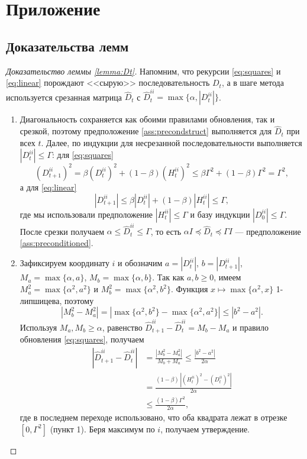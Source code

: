 \appendix
\section{Приложение}
\subsection{Доказательства лемм}
\label{appendix:lemmas}

\begin{proof}[Доказательство леммы \ref{lemma:Dt}]
Напомним, что рекурсии \eqref{eq:squares} и \eqref{eq:linear} порождают <<сырую>> последовательность $D_t$, а в шаге метода используется срезанная матрица $\hat{D}_t$ с $\hat{D}_t^{ii} = \max\{\alpha, |D_t^{ii}|\}$.
\begin{enumerate}
    \item Диагональность сохраняется как обоими правилами обновления, так и срезкой, поэтому предположение \ref{ass:precondstruct} выполняется для $\hat{D}_t$ при всех $t$. Далее, по индукции для несрезанной последовательности выполняется $|D_t^{ii}| \le \Gamma$: для \eqref{eq:squares}
    $$(D_{t+1}^{ii})^2 = \beta (D_t^{ii})^2 + (1-\beta)(H_t^{ii})^2 \le \beta \Gamma^2 + (1 - \beta)\Gamma^2 = \Gamma^2,$$
    а для \eqref{eq:linear}
    $$|D_{t+1}^{ii}| \le \beta |D_t^{ii}| + (1-\beta)|H_t^{ii}| \le \Gamma,$$
    где мы использовали предположение $|H_t^{ii}| \le \Gamma$ и базу индукции $|D_0^{ii}| \le \Gamma$. После срезки получаем $\alpha \le \hat{D}_t^{ii} \le \Gamma$, то есть $\alpha I \preccurlyeq \hat{D}_t \preccurlyeq \Gamma I$ --- предположение \ref{ass:preconditioned}.

    \item Зафиксируем координату $i$ и обозначим $a = |D_t^{ii}|$, $b = |D_{t+1}^{ii}|$, $M_a = \max\{\alpha, a\}$, $M_b = \max\{\alpha, b\}$. Так как $a, b \ge 0$, имеем $M_a^2 = \max\{\alpha^2, a^2\}$ и $M_b^2 = \max\{\alpha^2, b^2\}$. Функция $x \mapsto \max\{\alpha^2, x\}$ 1-липшицева, поэтому
    $$|M_b^2 - M_a^2| = |\max\{\alpha^2, b^2\} - \max\{\alpha^2, a^2\}| \le |b^2 - a^2|.$$
    Используя $M_a, M_b \ge \alpha$, равенство $\hat{D}_{t+1}^{ii} - \hat{D}_t^{ii} = M_b - M_a$ и правило обновления \eqref{eq:squares}, получаем
    \begin{equation*}
    \begin{split}
    |\hat{D}_{t+1}^{ii} - \hat{D}_t^{ii}| &= \frac{|M_b^2 - M_a^2|}{M_b + M_a} \le \frac{|b^2 - a^2|}{2\alpha} \\
    &= \frac{(1-\beta)\,|(H_t^{ii})^2 - (D_t^{ii})^2|}{2\alpha} \\
    &\le \frac{(1 - \beta)\Gamma^2}{2\alpha},
    \end{split}
    \end{equation*}
    где в последнем переходе использовано, что оба квадрата лежат в отрезке $[0, \Gamma^2]$ (пункт 1). Беря максимум по $i$, получаем утверждение.


\end{enumerate}
\end{proof}
